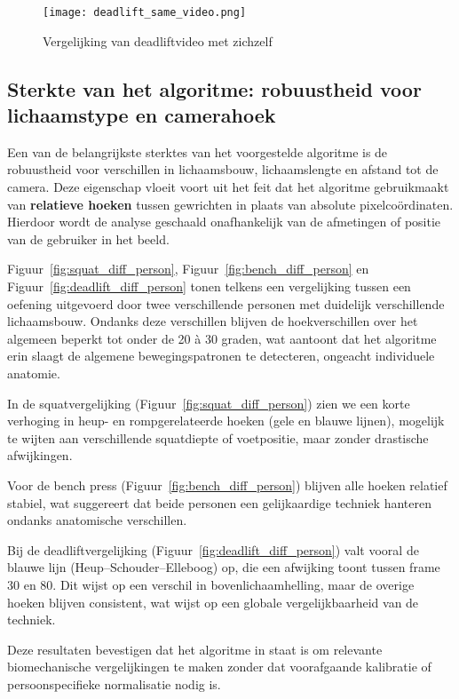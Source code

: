 \begin{figure}[h]
\centering
\texttt{[image: deadlift\_same\_video.png]}
\caption{Vergelijking van deadliftvideo met zichzelf}
\label{fig:deadlift_same}
\end{figure}

\subsection{Sterkte van het algoritme: robuustheid voor lichaamstype en camerahoek}

Een van de belangrijkste sterktes van het voorgestelde algoritme is de robuustheid voor verschillen in lichaamsbouw, lichaamslengte en afstand tot de camera. 
Deze eigenschap vloeit voort uit het feit dat het algoritme gebruikmaakt van \textbf{relatieve hoeken} tussen gewrichten in plaats van absolute pixelcoördinaten. 
Hierdoor wordt de analyse geschaald onafhankelijk van de afmetingen of positie van de gebruiker in het beeld.

Figuur~\ref{fig:squat_diff_person}, Figuur~\ref{fig:bench_diff_person} en Figuur~\ref{fig:deadlift_diff_person} tonen telkens een vergelijking tussen een oefening uitgevoerd door twee verschillende personen met duidelijk verschillende lichaamsbouw. 
Ondanks deze verschillen blijven de hoekverschillen over het algemeen beperkt tot onder de 20 à 30 graden, wat aantoont dat het algoritme erin slaagt de algemene bewegingspatronen te detecteren, ongeacht individuele anatomie.

In de squatvergelijking (Figuur~\ref{fig:squat_diff_person}) zien we een korte verhoging in heup- en rompgerelateerde hoeken (gele en blauwe lijnen), mogelijk te wijten aan verschillende squatdiepte of voetpositie, maar zonder drastische afwijkingen.

Voor de bench press (Figuur~\ref{fig:bench_diff_person}) blijven alle hoeken relatief stabiel, wat suggereert dat beide personen een gelijkaardige techniek hanteren ondanks anatomische verschillen.

Bij de deadliftvergelijking (Figuur~\ref{fig:deadlift_diff_person}) valt vooral de blauwe lijn (Heup–Schouder–Elleboog) op, die een afwijking toont tussen frame 30 en 80. Dit wijst op een verschil in bovenlichaamhelling, maar de overige hoeken blijven consistent, wat wijst op een globale vergelijkbaarheid van de techniek.

Deze resultaten bevestigen dat het algoritme in staat is om relevante biomechanische vergelijkingen te maken zonder dat voorafgaande kalibratie of persoonspecifieke normalisatie nodig is.

